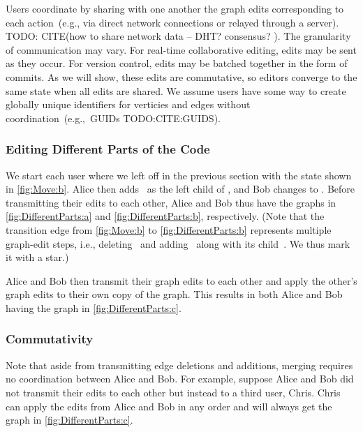 Users coordinate by sharing with one another the graph edits corresponding to each
action~(e.g., via direct network connections or relayed through a server).
TODO: CITE(how to share network data -- DHT? consensus? ).
The granularity of communication may vary.
For real-time collaborative editing, edits may be sent as they occur.
For version control, edits may be batched together in the form of commits.
As we will show, these edits are commutative, so editors converge to the same state
when all edits are shared.
We assume users have some way to create globally unique identifiers for
verticies and edges without coordination~(e.g.,~GUIDs TODO:CITE:GUIDS).

\subsubsection{Editing Different Parts of the Code}%
\label{sub:Editing Different Parts of the Code}

We start each user where we left off in the previous section with the state shown in \autoref{fig:Move:b}.
Alice then adds~\vDifferentPartsAlice{} as the left child of \vSimpleTimes{},
and Bob changes \vSimpleY{} to \vDifferentPartsBob{}.
Before transmitting their edits to each other,
Alice and Bob thus have the graphs in \autoref{fig:DifferentParts:a}
and \autoref{fig:DifferentParts:b}, respectively.
(Note that the transition edge from \autoref{fig:Move:b} to
\autoref{fig:DifferentParts:b} represents
multiple graph-edit steps, i.e., deleting~\eSimpleY{} and adding~\eDifferentPartsBob{} along with its child~\vDifferentPartsBob{}.
We thus mark it with a star.)

Alice and Bob then transmit their graph edits to each other
and apply the other's graph edits to their own copy of the graph.
This results in both Alice and Bob having the graph in
\autoref{fig:DifferentParts:c}.


\subsubsection{Commutativity}%
\label{sub:Commutativity:informal}

Note that aside from transmitting edge deletions and additions,
merging requires no coordination between Alice and Bob.
For example, suppose Alice and Bob did not transmit their edits to each other
but instead to a third user, Chris.
Chris can apply the edits from Alice and Bob in any order and will always get
the graph in \autoref{fig:DifferentParts:c}.

